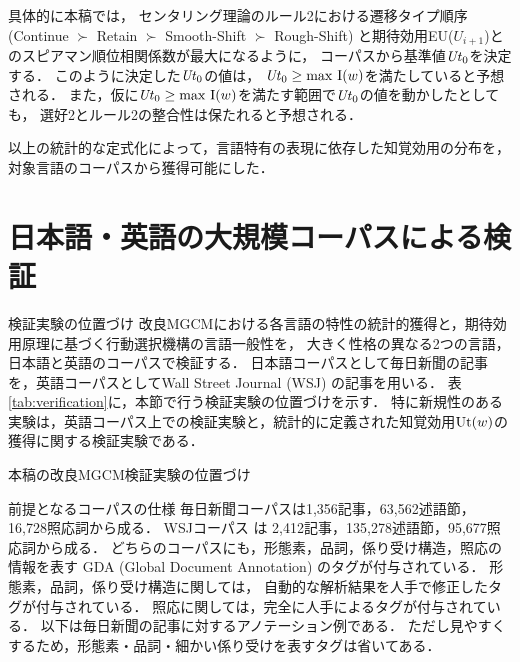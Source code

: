 \documentclass[japanese]{jnlp_1.3e}
\renewcommand{\paragraph}{}
\begin{document}
具体的に本稿では，
センタリング理論のルール2における遷移タイプ順序 (Continue $\succ$ Retain $\succ$ Smooth-Shift $\succ$ Rough-Shift)
と期待効用EU($U_{i+1}$)とのスピアマン順位相関係数が最大になるように，
コーパスから基準値${\it Ut}_0$を決定する．
このように決定した${\it Ut}_0 $の値は，
${\it Ut}_0 \ge {\rm max}~{\rm I}(w)$を満たしていると予想される．
また，仮に${\it Ut}_0 \ge {\rm max}~{\rm I}(w)$を満たす範囲で${\it Ut}_0$の値を動かしたとしても，
選好2とルール2の整合性は保たれると予想される．


以上の統計的な定式化によって，言語特有の表現に依存した知覚効用の分布を，
対象言語のコーパスから獲得可能にした．



\section{日本語・英語の大規模コーパスによる検証}
\label{sec:verification}

\paragraph{検証実験の位置づけ}
改良MGCMにおける各言語の特性の統計的獲得と，期待効用原理に基づく行動選択機構の言語一般性を，
大きく性格の異なる2つの言語，日本語と英語のコーパスで検証する．
日本語コーパスとして毎日新聞の記事を，英語コーパスとしてWall Street Journal (WSJ) の記事を用いる．
表\ref{tab:verification}に，本節で行う検証実験の位置づけを示す．
特に新規性のある実験は，英語コーパス上での検証実験と，統計的に定義された知覚効用${\rm Ut}(w)$の獲得に関する検証実験である．

\begin{table}[b]
\begin{center}
\caption{本稿の改良MGCM検証実験の位置づけ}
\label{tab:verification}

\end{center}
\end{table}



\paragraph{前提となるコーパスの仕様}
毎日新聞コーパスは1,356記事，63,562述語節，16,728照応詞から成る．
WSJコーパス は 2,412記事，135,278述語節，95,677照応詞から成る．
どちらのコーパスにも，形態素，品詞，係り受け構造，照応の情報を表す
GDA (Global Document Annotation)  のタグが付与されている．
形態素，品詞，係り受け構造に関しては，
自動的な解析結果を人手で修正したタグが付与されている．
照応に関しては，完全に人手によるタグが付与されている．
以下は毎日新聞の記事に対するアノテーション例である．
ただし見やすくするため，形態素・品詞・細かい係り受けを表すタグは省いてある．
\vspace{1\baselineskip}
\end{document}
